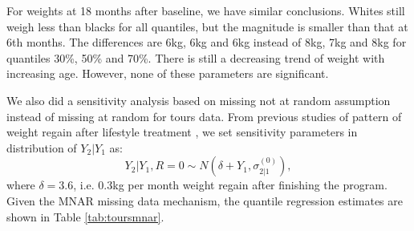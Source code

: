 \documentclass[12pt]{article}
\begin{document}
For weights at 18 months after baseline, we have similar
conclusions. Whites still weigh less than blacks for all quantiles,
but the magnitude is smaller than that at 6th months.  The differences
are 6kg, 6kg and 6kg instead of 8kg, 7kg and 8kg for quantiles 30\%,
50\% and 70\%. There is still a decreasing trend of weight with
increasing age.  However, none of these parameters are significant.

We also did a sensitivity analysis based on missing not at random
assumption instead of missing at random for tours data. From previous
studies of pattern of weight regain after lifestyle treatment
\citep{jeffery2000, wadden2001, wadden2005}, we set sensitivity
parameters in distribution of $Y_2|Y_1$ as:
\begin{displaymath}
  Y_2  | Y_1, R = 0 \sim N \left(\delta + Y_1, \sigma_{2|1}^{(0)} \right),
\end{displaymath}
where $\delta = 3.6$, i.e. 0.3kg per month weight regain after
finishing the program.  Given the MNAR missing data mechanism, the
quantile regression estimates are shown in Table \ref{tab:toursmnar}.
\end{document}
